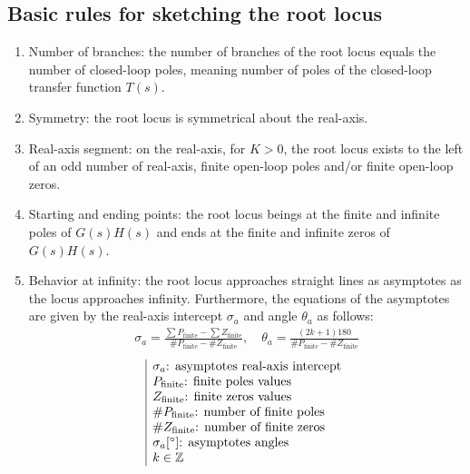 \documentclass[10pt, twocolumn]{article}
\begin{document}
\subsection{Basic rules for sketching the root locus}
\begin{enumerate}
  \item Number of branches: the number of branches of the root locus equals the number of closed-loop poles, meaning number of poles of the closed-loop transfer function \(T(s)\).
  \item Symmetry: the root locus is symmetrical about the real-axis.
  \item Real-axis segment: on the real-axis, for \(K > 0\), the root locus exists to the left of an odd number of real-axis, finite open-loop poles and/or finite open-loop zeros.
  \item Starting and ending points: the root locus beings at the finite and infinite poles of \(G(s)H(s)\) and ends at the finite and infinite zeros of \(G(s)H(s)\).
  \item Behavior at infinity: the root locus approaches straight lines as asymptotes as the locus approaches infinity.
        Furthermore, the equations of the asymptotes are given by the real-axis intercept \(\sigma_a\) and angle \(\theta_a\) as follows:
        \begin{align*}
          \sigma_a = \frac{\sum{P_\mathrm{finite}} - \sum{Z_\mathrm{finite}}}{\#P_\mathrm{finite} - \#Z_\mathrm{finite}}, \quad \theta_a = \frac{(2k + 1) 180}{\#P_\mathrm{finite} - \#Z_\mathrm{finite}}
        \end{align*}
        \[
          \begin{array}{|l}
            \sigma_a \text{: asymptotes real-axis intercept}    \\
            P_\mathrm{finite} \text{: finite poles values}      \\
            Z_\mathrm{finite} \text{: finite zeros values}      \\
            \#P_\mathrm{finite} \text{: number of finite poles} \\
            \#Z_\mathrm{finite} \text{: number of finite zeros} \\
            \sigma_a [\si{\degree}] \text{: asymptotes angles}  \\
            k \in \mathbb{Z}_{}^{}
          \end{array}
        \]
\end{enumerate}
\end{document}

